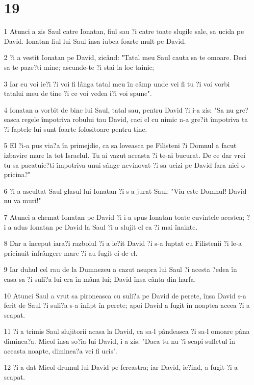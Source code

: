 \chapter{19}

\par 1 Atunci a zis Saul catre Ionatan, fiul sau ?i catre toate slugile sale, sa ucida pe David. Ionatan fiul lui Saul însa iubea foarte mult pe David.
\par 2 ?i a vestit Ionatan pe David, zicând: "Tatal meu Saul cauta sa te omoare. Deci sa te paze?ti mine; ascunde-te ?i stai la loc tainic;
\par 3 Iar eu voi ie?i ?i voi fi lânga tatal meu în câmp unde vei fi tu ?i voi vorbi tatalui meu de tine ?i ce voi vedea i?i voi spune".
\par 4 Ionatan a vorbit de bine lui Saul, tatal sau, pentru David ?i i-a zis: "Sa nu gre?easca regele împotriva robului tau David, caci el cu nimic n-a gre?it împotriva ta ?i faptele lui sunt foarte folositoare pentru tine.
\par 5 El ?i-a pus via?a în primejdie, ca sa loveasca pe Filisteni ?i Domnul a facut izbavire mare la tot Israelul. Tu ai vazut aceasta ?i te-ai bucurat. De ce dar vrei tu sa pacatuie?ti împotriva unui sânge nevinovat ?i sa ucizi pe David fara nici o pricina?"
\par 6 ?i a ascultat Saul glasul lui Ionatan ?i s-a jurat Saul: "Viu este Domnul! David nu va muri!"
\par 7 Atunci a chemat Ionatan pe David ?i i-a spus Ionatan toate cuvintele acestea; ?i a adus Ionatan pe David la Saul ?i a slujit el ca ?i mai înainte.
\par 8 Dar a început iara?i razboiul ?i a ie?it David ?i s-a luptat cu Filistenii ?i le-a pricinuit înfrângere mare ?i au fugit ei de el.
\par 9 Iar duhul cel rau de la Dumnezeu a cazut asupra lui Saul ?i acesta ?edea în casa sa ?i suli?a lui era în mâna lui; David însa cânta din harfa.
\par 10 Atunci Saul a vrut sa pironeasca cu suli?a pe David de perete, însa David s-a ferit de Saul ?i suli?a s-a înfipt în perete; apoi David a fugit în noaptea aceea ?i a scapat.
\par 11 ?i a trimis Saul slujitorii acasa la David, ca sa-l pândeasca ?i sa-l omoare pâna diminea?a. Micol însa so?ia lui David, i-a zis: "Daca tu nu-?i scapi sufletul în aceasta noapte, diminea?a vei fi ucis".
\par 12 ?i a dat Micol drumul lui David pe fereastra; iar David, ie?ind, a fugit ?i a scapat.

